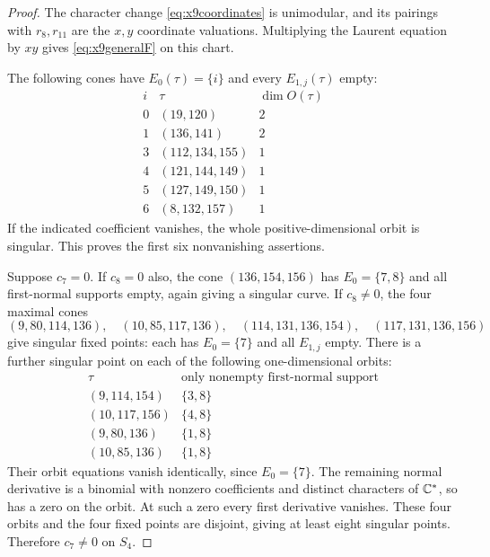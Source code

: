 \begin{proof}
The character change \eqref{eq:x9coordinates} is unimodular, and its
pairings with $r_8,r_{11}$ are the $x,y$ coordinate valuations. Multiplying
the Laurent equation by $xy$ gives \eqref{eq:x9generalF} on this chart.

The following cones have $E_0(\tau)=\{i\}$ and every $E_{1,j}(\tau)$
empty:
\[
\begin{array}{c|c|c}
i&\tau&\dim O(\tau)\\\hline
0&(19,120)&2\\
1&(136,141)&2\\
3&(112,134,155)&1\\
4&(121,144,149)&1\\
5&(127,149,150)&1\\
6&(8,132,157)&1
\end{array}
\]
If the indicated coefficient vanishes, the whole positive-dimensional
orbit is singular. This proves the first six nonvanishing assertions.

Suppose $c_7=0$. If $c_8=0$ also, the cone $(136,154,156)$ has
$E_0=\{7,8\}$ and all first-normal supports empty, again giving a
singular curve. If $c_8\ne0$, the four maximal cones
\[
 (9,80,114,136),\quad(10,85,117,136),\quad
 (114,131,136,154),\quad(117,131,136,156)
\]
give singular fixed points: each has $E_0=\{7\}$ and all
$E_{1,j}$ empty. There is a further singular point on each of the
following one-dimensional orbits:
\[
\begin{array}{c|c}
\tau&\text{only nonempty first-normal support}\\\hline
(9,114,154)&\{3,8\}\\
(10,117,156)&\{4,8\}\\
(9,80,136)&\{1,8\}\\
(10,85,136)&\{1,8\}
\end{array}
\]
Their orbit equations vanish identically, since $E_0=\{7\}$.
The remaining normal derivative is a binomial with nonzero coefficients
and distinct characters of $\mathbb C^*$, so has a zero on the orbit. At such a
zero every first derivative vanishes. These four orbits and the four
fixed points are disjoint, giving at least eight singular points.
Therefore $c_7\ne0$ on $S_4$.


\end{proof}
